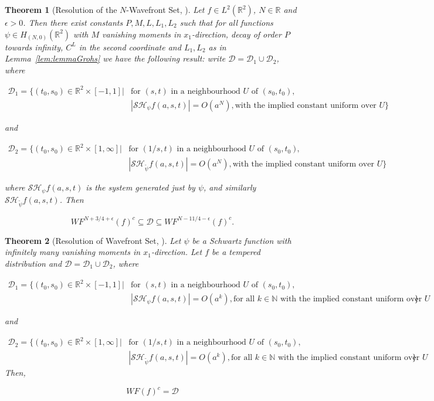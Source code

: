\documentclass[a4paper]{article}
\newtheorem{theorem}{Theorem}
\begin{document}
\begin{theorem}[Resolution of the $N$-Wavefront Set, \cite{WaveFrontSetGrohs}]
\label{thm:Resolution1}
Let $f\in L^2(\mathbb{R}^2)$, $N\in\mathbb{R}$ and $\epsilon >0$. Then there exist constants $P, M, L, L_1, L_2$ such that for all functions $\psi\in H_{(N,0)}(\mathbb{R}^2)$ with $M$ vanishing moments in $x_1$-direction, decay of order $P$ towards infinity, $C^L$ in the second coordinate and $L_1,L_2$ as in Lemma~\ref{lem:lemmaGrohs} we have the following result: write $\mathcal{D}=\mathcal{D}_1\cup\mathcal{D}_2$, where 

$$
\begin{aligned}
\mathcal{D}_1=\{ (t_0,s_0)\in\mathbb{R}^2\times [-1,1]|& \text{for $(s,t)$ in a neighbourhood $U$ of $(s_0,t_0)$},\\
&|\mathcal{SH}_{\psi}f(a,s,t)|=O(a^N), \text{with the implied constant uniform over $U$} \}
\end{aligned}
$$ 

and

$$
\begin{aligned}
\mathcal{D}_2=\{ (t_0,s_0)\in\mathbb{R}^2\times [1,\infty]|& \text{for $(1/s,t)$ in a neighbourhood $U$ of $(s_0,t_0)$},\\
&|\mathcal{SH}_{\tilde{\psi}}f(a,s,t)|=O(a^N), \text{with the implied constant uniform over $U$} \}
\end{aligned}
$$ 

where $\mathcal{SH}_{\psi}f(a,s,t)$ is the system generated just by $\psi$, and similarly $\mathcal{SH}_{\tilde{\psi}}f(a,s,t)$. Then 

$$
WF^{N+3/4+\epsilon}(f)^c\subseteq \mathcal{D}\subseteq WF^{N-11/4-\epsilon}(f)^c.
$$
\end{theorem}

\bigskip

\begin{theorem}[Resolution of Wavefront Set, \cite{WaveFrontSetGrohs}]
\label{thm:Resolution2}
Let $\psi$ be a Schwartz function with infinitely many vanishing moments in $x_1$-direction. Let $f$ be a tempered distribution and $\mathcal{D}=\mathcal{D}_1\cup\mathcal{D}_2$, where

$$
\begin{aligned}
\mathcal{D}_1=\{ (t_0,s_0)\in\mathbb{R}^2\times [-1,1]|& \text{for $(s,t)$ in a neighbourhood $U$ of $(s_0,t_0)$},\\
&|\mathcal{SH}_{\psi}f(a,s,t)|=O(a^k), \text{for all $k\in \mathbb{N}$ with the implied constant uniform over $U$} \}
\end{aligned}
$$

and

$$
\begin{aligned}
\mathcal{D}_2=\{ (t_0,s_0)\in\mathbb{R}^2\times [1,\infty]|& \text{for $(1/s,t)$ in a neighbourhood $U$ of $(s_0,t_0)$},\\
&|\mathcal{SH}_{\tilde{\psi}}f(a,s,t)|=O(a^k), \text{for all $k\in \mathbb{N}$ with the implied constant uniform over $U$} \}
\end{aligned}
$$
Then,

$$
WF(f)^c=\mathcal{D}
$$
\end{theorem}
\end{document}
